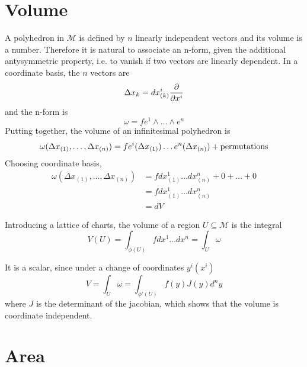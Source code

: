 \section{Volume}   

    A polyhedron in $\mathcal M$ is defined by $n$ linearly independent vectors and its volume is a number. Therefore it is natural to associate an n-form, given the additional antysymmetric property, i.e. to vanish if two vectors are linearly dependent. In a coordinate basis, the $n$ vectors are
    \begin{equation*}
        \Delta x_k = dx^i_{(k)} \frac{\partial}{\partial x^i}
    \end{equation*}
    and the n-form is 
    \begin{equation*}
        \omega = f e^1 \wedge \ldots \wedge e^n
    \end{equation*}
    Putting together, the volume of an infinitesimal polyhedron is 
    \begin{equation*}
        \omega (\Delta x_{(1)}, \ldots, \Delta x_{(n)}) = f e^i(\Delta x_{(1)}) \ldots e^n(\Delta x_{(n)}) + \textnormal{permutations}
    \end{equation*}
    Choosing coordinate basis, 
    \begin{equation*}
    \begin{aligned}
        \omega (\Delta x_{(1)}, \ldots, \Delta x_{(n)}) & = f dx^1_{(1)} \ldots dx^n_{(n)} + 0 + \ldots + 0 \\ & = f dx^1_{(1)} \ldots dx^n_{(n)} \\ & = dV
    \end{aligned}
    \end{equation*}

    Introducing a lattice of charts, the volume of a region $U \subseteq \mathcal M$ is the integral 
    \begin{equation*}
        V(U) = \int_{\phi(U)} f dx^1 \ldots dx^n = \int_U \omega 
    \end{equation*}

    It is a scalar, since under a change of coordinates $y^i(x^i)$
    \begin{equation*}
        V = \int_U \omega = \int_{\phi'(U)} f(y) J(y) d^n y
    \end{equation*}
    where $J$ is the determinant of the jacobian, which shows that the volume is coordinate independent. 

\section{Area}

